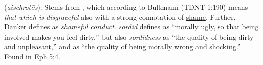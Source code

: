 \item[Sordid,]

(\textit{aischrotēs}):
Stems from , which according to Bultmann (TDNT 1:190) means \emph{that which is disgraceful} also with a strong connotation of \underline{shame}. Further, Danker defines  as \emph{shameful conduct}. \emph{sordid} defines as ``morally ugly, so that being involved makes you feel dirty,'' but also \emph{sordidness} as ``the quality of being dirty and unpleasant,'' and as ``the quality of being morally wrong and shocking.''
Found in Eph 5:4.
